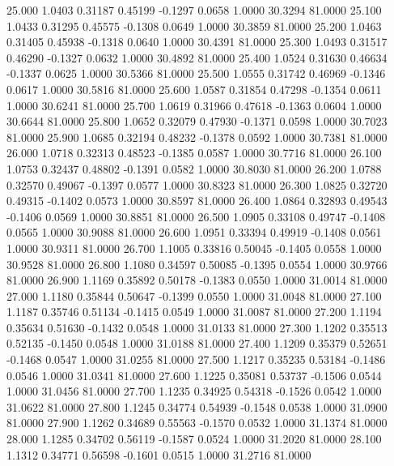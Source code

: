   25.000   1.0403   0.31187   0.45199  -0.1297   0.0658   1.0000  30.3294  81.0000
  25.100   1.0433   0.31295   0.45575  -0.1308   0.0649   1.0000  30.3859  81.0000
  25.200   1.0463   0.31405   0.45938  -0.1318   0.0640   1.0000  30.4391  81.0000
  25.300   1.0493   0.31517   0.46290  -0.1327   0.0632   1.0000  30.4892  81.0000
  25.400   1.0524   0.31630   0.46634  -0.1337   0.0625   1.0000  30.5366  81.0000
  25.500   1.0555   0.31742   0.46969  -0.1346   0.0617   1.0000  30.5816  81.0000
  25.600   1.0587   0.31854   0.47298  -0.1354   0.0611   1.0000  30.6241  81.0000
  25.700   1.0619   0.31966   0.47618  -0.1363   0.0604   1.0000  30.6644  81.0000
  25.800   1.0652   0.32079   0.47930  -0.1371   0.0598   1.0000  30.7023  81.0000
  25.900   1.0685   0.32194   0.48232  -0.1378   0.0592   1.0000  30.7381  81.0000
  26.000   1.0718   0.32313   0.48523  -0.1385   0.0587   1.0000  30.7716  81.0000
  26.100   1.0753   0.32437   0.48802  -0.1391   0.0582   1.0000  30.8030  81.0000
  26.200   1.0788   0.32570   0.49067  -0.1397   0.0577   1.0000  30.8323  81.0000
  26.300   1.0825   0.32720   0.49315  -0.1402   0.0573   1.0000  30.8597  81.0000
  26.400   1.0864   0.32893   0.49543  -0.1406   0.0569   1.0000  30.8851  81.0000
  26.500   1.0905   0.33108   0.49747  -0.1408   0.0565   1.0000  30.9088  81.0000
  26.600   1.0951   0.33394   0.49919  -0.1408   0.0561   1.0000  30.9311  81.0000
  26.700   1.1005   0.33816   0.50045  -0.1405   0.0558   1.0000  30.9528  81.0000
  26.800   1.1080   0.34597   0.50085  -0.1395   0.0554   1.0000  30.9766  81.0000
  26.900   1.1169   0.35892   0.50178  -0.1383   0.0550   1.0000  31.0014  81.0000
  27.000   1.1180   0.35844   0.50647  -0.1399   0.0550   1.0000  31.0048  81.0000
  27.100   1.1187   0.35746   0.51134  -0.1415   0.0549   1.0000  31.0087  81.0000
  27.200   1.1194   0.35634   0.51630  -0.1432   0.0548   1.0000  31.0133  81.0000
  27.300   1.1202   0.35513   0.52135  -0.1450   0.0548   1.0000  31.0188  81.0000
  27.400   1.1209   0.35379   0.52651  -0.1468   0.0547   1.0000  31.0255  81.0000
  27.500   1.1217   0.35235   0.53184  -0.1486   0.0546   1.0000  31.0341  81.0000
  27.600   1.1225   0.35081   0.53737  -0.1506   0.0544   1.0000  31.0456  81.0000
  27.700   1.1235   0.34925   0.54318  -0.1526   0.0542   1.0000  31.0622  81.0000
  27.800   1.1245   0.34774   0.54939  -0.1548   0.0538   1.0000  31.0900  81.0000
  27.900   1.1262   0.34689   0.55563  -0.1570   0.0532   1.0000  31.1374  81.0000
  28.000   1.1285   0.34702   0.56119  -0.1587   0.0524   1.0000  31.2020  81.0000
  28.100   1.1312   0.34771   0.56598  -0.1601   0.0515   1.0000  31.2716  81.0000
